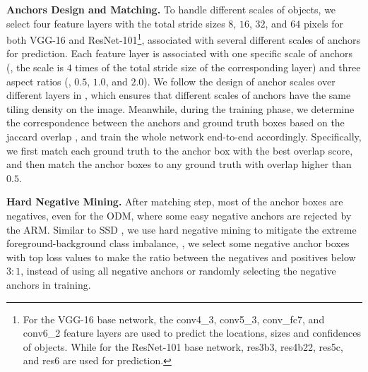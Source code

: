 \documentclass[10pt,twocolumn,letterpaper]{article}
\begin{document}
{\noindent \textbf{Anchors Design and Matching.}}
To handle different scales of objects, we select four feature layers with the total stride sizes $8$, $16$, $32$, and $64$ pixels for both VGG-16 and ResNet-101\footnote{For the VGG-16 base network, the conv4\_3, conv5\_3, conv\_fc7, and conv6\_2 feature layers are used to predict the locations, sizes and confidences of objects. While for the ResNet-101 base network, res3b3, res4b22, res5c, and res6 are used for prediction.}, associated with several different scales of anchors for prediction. Each feature layer is associated with one specific scale of anchors (\ie, the scale is $4$ times of the total stride size of the corresponding layer) and three aspect ratios (\ie, $0.5$, $1.0$, and $2.0$). We follow the design of anchor scales over different layers in \cite{DBLP:conf/iccv/abs-1708-05237}, which ensures that different scales of anchors have the same tiling density \cite{DBLP:conf/ccbr/ZhangZLSWL17,DBLP:conf/ijcb/abs-1708-05234} on the image. Meanwhile, during the training phase, we determine the correspondence between the anchors and ground truth boxes based on the jaccard overlap \cite{DBLP:conf/cvpr/ErhanSTA14}, and train the whole network end-to-end accordingly. Specifically, we first match each ground truth to the anchor box with the best overlap score, and then match the anchor boxes to any ground truth with overlap higher than $0.5$.

{\noindent \textbf{Hard Negative Mining.}}
After matching step, most of the anchor boxes are negatives, even for the ODM, where some easy negative anchors are rejected by the ARM. Similar to SSD \cite{DBLP:conf/eccv/LiuAESRFB16}, we use hard negative mining to mitigate the extreme foreground-background class imbalance, \ie, we select some negative anchor boxes with top loss values to make the ratio between the negatives and positives below $3:1$, instead of using all negative anchors or randomly selecting the negative anchors in training.
\end{document}
